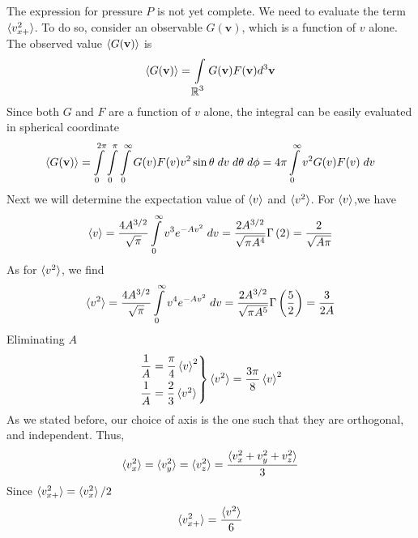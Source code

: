 \documentclass[../../../Main.tex]{subfiles}
\begin{document}
The expression for pressure $P$ is not yet complete. We need to evaluate the term $\braket{v_{x+}^2}$. To do so, consider an observable $G(\mathbf{v})$, which is a function of $v$ alone. The observed value $\braket{G(\mathbf{v})}$ is 
\begin{equation*}
    \braket{G(\mathbf{v})}=\int\displaylimits_{\displaystyle\mathbb{R}^3} G(\mathbf{v}) F(\mathbf{v})d^3\mathbf{v} 
\end{equation*}
Since both $G$ and $F$ are a function of $v$ alone, the integral can be easily evaluated in spherical coordinate
\begin{equation*}
    \braket{G(\mathbf{v})}=\int\displaylimits_{0}^{2\pi} \int\displaylimits_{0}^{ \pi} \int\displaylimits_{0}^{\infty} 
    G(v)F(v)v^2\sin\theta\;dv\;d\theta\;d\phi=4\pi  \int\displaylimits_{0}^{\infty} v^2G(v)F(v)\;dv
\end{equation*}
Next we will determine the expectation value of $\braket{v}$ and $\braket{v^2}$. For $\braket{v}$,we have
\begin{equation*}
    \braket{v}=\frac{4A^{3/2}}{\sqrt{\pi}} \int\displaylimits_{0}^{\infty} v^3 e^{-Av^2}\;dv=\frac{2A^{3/2}}{\sqrt{\pi A^{4}}}\Gamma\left(2\right)=\frac{2}{\sqrt{A\pi}}
\end{equation*}
As for $\braket{v^2}$, we find
\begin{equation*}
    \braket{v^2}=\frac{4A^{3/2}}{\sqrt{\pi}} \int\displaylimits_{0}^{\infty} v^4e^{-Av^2}\;dv
    =\frac{2A^{3/2}}{\sqrt{\pi A^{5}}}\Gamma \left(\frac{5}{2} \right) =\frac{3}{2A}
\end{equation*}
Eliminating $A$
\begin{equation*}
    \begin{rcases*}
    \dfrac{1}{A}=\dfrac{\pi }{4}\braket{v}^2\\
    \dfrac{1}{A}=\dfrac{2}{3}\braket{v^2}
    \end{rcases*}
    \braket{v^2}=\frac{3\pi}{8}\braket{v}^2
\end{equation*}
As we stated before, our choice of axis is the one such that they are orthogonal, and independent. Thus,
\begin{equation*}
    \braket{v_x^2}=\braket{v_y^2}=\braket{v_z^2}=\frac{\braket{v_x^2+v_y^2 +v_z^2}}{3}
\end{equation*}
Since $\braket{v_{x+}^2}=\braket{v_{x}^2}/2$
\begin{equation*}
    \braket{v_{x+}^2}=\frac{\braket{v^2}}{6}
\end{equation*}
\end{document}
